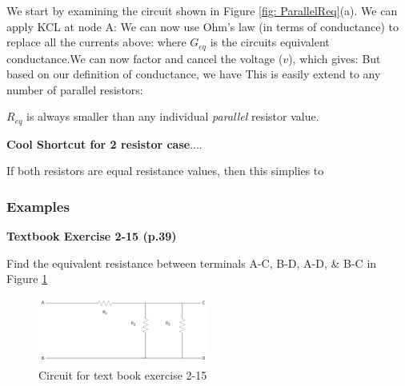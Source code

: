 \documentclass{handout}
\begin{document}
We start by examining the circuit shown in Figure \ref{fig: ParallelReq}(a). We can apply KCL at node A:
We can now use Ohm's law (in terms of conductance) to replace all the currents above:
where $G_{eq}$ is the circuits equivalent conductance.We can now factor and cancel the voltage ($v$), which gives:
But based on our definition of conductance, we have
This is easily extend to any number of parallel resistors:

$R_{eq}$ is always smaller than any individual {\em parallel} resistor value.

\textbf{Cool Shortcut for 2 resistor case}....


If both resistors are equal resistance values, then this simplies to


\pagebreak

\subsubsection{Examples}
\textbf{Textbook Exercise 2-15 (p.39)}

Find the equivalent resistance between terminals A-C, B-D, A-D, \& B-C in Figure \ref{fig: Ex2_15}

\begin{figure}[h t b]
\centering
\includegraphics[width=0.5\textwidth]{Ex2_15.jpg}
\caption{Circuit for text book exercise 2-15}
\label{fig: Ex2_15}
\end{figure}
\end{document}
